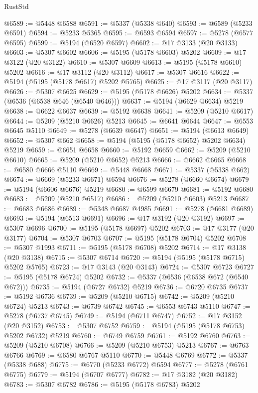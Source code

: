 \begin{lexlean}{RustStd}
\begin{coremodule}
@6589 := @5448 @6588
@6591 := @5337 (@5338 @640)
@6593 := @6589 (@5233 @6591)
@6594 := @5233 @5365
@6595 := @6593 @6594
@6597 := @5278 (@6577 @6595)
@6599 := @5194 (@6520 @6597)
@6602 := @17 @3133 (@20 @3133)
@6603 := @5307 @6602
@6606 := @5195 (@5178 @6603) @5202
@6609 := @17 @3122 (@20 @3122)
@6610 := @5307 @6609
@6613 := @5195 (@5178 @6610) @5202
@6616 := @17 @3112 (@20 @3112)
@6617 := @5307 @6616
@6622 := @5194 (@5195 (@5178 @6617) @5202 @5765)
@6625 := @17 @3117 (@20 @3117)
@6626 := @5307 @6625
@6629 := @5195 (@5178 @6626) @5202
@6634 := @5337 (@6536 (@6538 @646 (@6540 @646)))
@6637 := @5194 (@6629 @6634) @5219
@6638 := @6622 @6637
@6639 := @5192 @6638
@6641 := @5209 (@5210 @6617)
@6644 := @5209 (@5210 @6626) @5213
@6645 := @6641 @6644
@6647 := @6553 @6645 @5110
@6649 := @5278 (@6639 @6647)
@6651 := @5194 (@6613 @6649)
@6652 := @5307 @662
@6658 := @5194 (@5195 (@5178 @6652) @5202 @6634) @5219
@6659 := @6651 @6658
@6660 := @5192 @6659
@6662 := @5209 (@5210 @6610)
@6665 := @5209 (@5210 @6652) @5213
@6666 := @6662 @6665
@6668 := @6580 @6666 @5110
@6669 := @5448 @6668
@6671 := @5337 (@5338 @662)
@6674 := @6669 (@5233 @6671) @6594
@6676 := @5278 (@6660 @6674)
@6679 := @5194 (@6606 @6676) @5219
@6680 := @6599 @6679
@6681 := @5192 @6680
@6683 := @5209 (@5210 @6517)
@6686 := @5209 (@5210 @6603) @5213
@6687 := @6683 @6686
@6689 := @5348 @6687 @4985
@6691 := @5278 (@6681 @6689)
@6693 := @5194 (@6513 @6691)
@6696 := @17 @3192 (@20 @3192)
@6697 := @5307 @6696
@6700 := @5195 (@5178 @6697) @5202
@6703 := @17 @3177 (@20 @3177)
@6704 := @5307 @6703
@6707 := @5195 (@5178 @6704) @5202
@6708 := @5307 @1993
@6711 := @5195 (@5178 @6708) @5202
@6714 := @17 @3138 (@20 @3138)
@6715 := @5307 @6714
@6720 := @5194 (@5195 (@5178 @6715) @5202 @5765)
@6723 := @17 @3143 (@20 @3143)
@6724 := @5307 @6723
@6727 := @5195 (@5178 @6724) @5202
@6732 := @5337 (@6536 (@6538 @672 (@6540 @672)))
@6735 := @5194 (@6727 @6732) @5219
@6736 := @6720 @6735
@6737 := @5192 @6736
@6739 := @5209 (@5210 @6715)
@6742 := @5209 (@5210 @6724) @5213
@6743 := @6739 @6742
@6745 := @6553 @6743 @5110
@6747 := @5278 (@6737 @6745)
@6749 := @5194 (@6711 @6747)
@6752 := @17 @3152 (@20 @3152)
@6753 := @5307 @6752
@6759 := @5194 (@5195 (@5178 @6753) @5202 @6732) @5219
@6760 := @6749 @6759
@6761 := @5192 @6760
@6763 := @5209 (@5210 @6708)
@6766 := @5209 (@5210 @6753) @5213
@6767 := @6763 @6766
@6769 := @6580 @6767 @5110
@6770 := @5448 @6769
@6772 := @5337 (@5338 @688)
@6775 := @6770 (@5233 @6772) @6594
@6777 := @5278 (@6761 @6775)
@6779 := @5194 (@6707 @6777)
@6782 := @17 @3182 (@20 @3182)
@6783 := @5307 @6782
@6786 := @5195 (@5178 @6783) @5202

\end{coremodule}
\end{lexlean}
